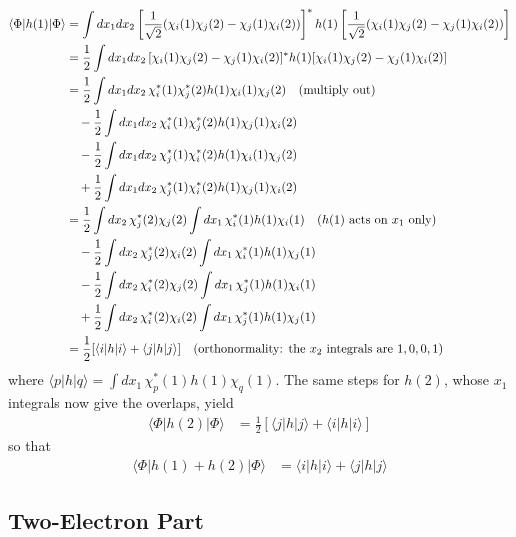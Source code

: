 \begin{align*}
\langle \Phi|h(1)|\Phi\rangle &= \int dx_1 dx_2 \left[ \frac{1}{\sqrt{2}} (\chi_i(1) \chi_j(2) - \chi_j(1) \chi_i(2)) \right]^* h(1) \left[ \frac{1}{\sqrt{2}} (\chi_i(1) \chi_j(2) - \chi_j(1) \chi_i(2)) \right] \\
&= \frac{1}{2} \int dx_1 dx_2\, [\chi_i(1) \chi_j(2) - \chi_j(1) \chi_i(2)]^* h(1) [\chi_i(1) \chi_j(2) - \chi_j(1) \chi_i(2)] \\
&= \frac{1}{2} \int dx_1 dx_2\, \chi_i^*(1) \chi_j^*(2) h(1) \chi_i(1) \chi_j(2) \quad\text{(multiply out)} \\
&\quad - \frac{1}{2} \int dx_1 dx_2\, \chi_i^*(1) \chi_j^*(2) h(1) \chi_j(1) \chi_i(2) \\
&\quad - \frac{1}{2} \int dx_1 dx_2\, \chi_j^*(1) \chi_i^*(2) h(1) \chi_i(1) \chi_j(2) \\
&\quad + \frac{1}{2} \int dx_1 dx_2\, \chi_j^*(1) \chi_i^*(2) h(1) \chi_j(1) \chi_i(2) \\
&= \frac{1}{2} \int dx_2\, \chi_j^*(2) \chi_j(2) \int dx_1\, \chi_i^*(1) h(1) \chi_i(1) \quad\text{($h(1)$ acts on $x_1$ only)} \\
&\quad - \frac{1}{2} \int dx_2\, \chi_j^*(2) \chi_i(2) \int dx_1\, \chi_i^*(1) h(1) \chi_j(1) \\
&\quad - \frac{1}{2} \int dx_2\, \chi_i^*(2) \chi_j(2) \int dx_1\, \chi_j^*(1) h(1) \chi_i(1) \\
&\quad + \frac{1}{2} \int dx_2\, \chi_i^*(2) \chi_i(2) \int dx_1\, \chi_j^*(1) h(1) \chi_j(1) \\
&= \frac{1}{2} [\langle i|h|i\rangle + \langle j|h|j\rangle] \quad\text{(orthonormality: the $x_2$ integrals are $1, 0, 0, 1$)}
\end{align*}
where $\langle p|h|q\rangle = \int dx_1\, \chi_p^*(1) h(1) \chi_q(1)$. The same steps for $h(2)$, whose $x_1$ integrals now give the overlaps, yield
\begin{align*}
\langle \Phi|h(2)|\Phi\rangle &= \frac{1}{2} [\langle j|h|j\rangle + \langle i|h|i\rangle]
\end{align*}
so that
\begin{align*}
\langle \Phi|h(1) + h(2)|\Phi\rangle &= \langle i|h|i\rangle + \langle j|h|j\rangle
\end{align*}

\subsection{Two-Electron Part}

